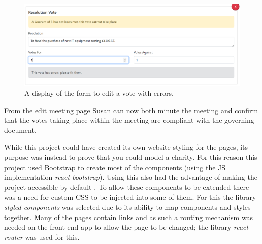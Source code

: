 \documentclass{UoYCSproject}
\begin{document}
\begin{figure}[h]
\begin{center}
\includegraphics[width=\textwidth]{"./assets/apendix/frontend-screenshots/Minutes Edit - Errors.png"}
\end{center}
\caption{A display of the form to edit a vote with errors.}
\label{fig:edit_minutes_errors}
\end{figure}

From the edit meeting page Susan can now both minute the meeting and confirm that the votes taking place within the meeting are compliant with the governing document.

While this project could have created its own website styling for the pages, its purpose was instead to prove that you could model a charity. For this reason this project used Bootstrap \cite{bootstrap_homepage} to create most of the components (using the JS implementation \textit{react-bootstrap}\cite{react_bootstrap_2023}). Using this also had the advantage of making the project accessible by default \cite{otto_thornton_bootstrap_2021}. To allow these components to be extended there was a need for custom CSS to be injected into some of them. For this the library \textit{styled-components} was selected due to its ability to map components and styles together. Many of the pages contain links and as such a routing mechanism was needed on the front end app to allow the page to be changed; the library \textit{react-router} was used for this\cite{react-router}.
\end{document}
